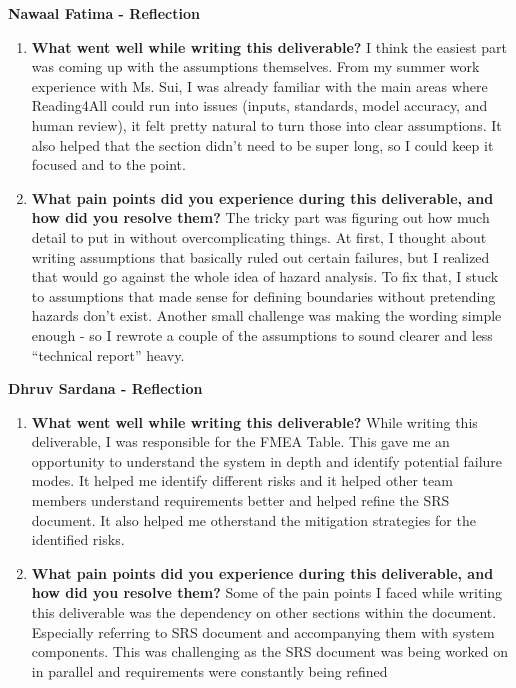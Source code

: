 \documentclass{article}
\begin{document}
\textbf{Nawaal Fatima  - Reflection}
\begin{enumerate}
  \item \textbf{What went well while writing this deliverable?}\newline
    I think the easiest part was coming up with the assumptions
    themselves. From my summer work experience with Ms. Sui, I was already familiar with the main areas where Reading4All
    could run into issues (inputs, standards, model accuracy, and
    human review), it felt pretty natural to turn those into clear
    assumptions. It also helped that the section didn’t need to be
    super long, so I could keep it focused and to the point.

  \item \textbf{What pain points did you experience during this
    deliverable, and how did you resolve them?}\newline
    The tricky part was figuring out how much detail to put in
    without overcomplicating things. At first, I thought about
    writing assumptions that basically ruled out certain failures,
    but I realized that would go against the whole idea of hazard
    analysis. To fix that, I stuck to assumptions that made sense for
    defining boundaries without pretending hazards don’t exist.
    Another small challenge was making the wording simple enough - so
    I rewrote a couple of the assumptions to sound clearer and less
    ``technical report'' heavy.
\end{enumerate}

\textbf{Dhruv Sardana  - Reflection}
\begin{enumerate}
  \item \textbf{What went well while writing this deliverable?}\newline
    While writing this deliverable, I was responsible for the FMEA Table. This gave me an opportunity to 
    understand the system in depth and identify potential failure modes. It helped me identify different risks and 
    it helped other team members understand requirements better and helped refine the SRS document. 
    It also helped me otherstand the mitigation strategies for the identified risks.

  \item \textbf{What pain points did you experience during this
    deliverable, and how did you resolve them?}\newline
    Some of the pain points I faced while writing this deliverable was the dependency on other sections within the document.
    Especially referring to SRS document and accompanying them with system components. 
    This was challenging as the SRS document was being worked on in parallel and requirements were constantly being refined
\end{enumerate}
\end{document}
